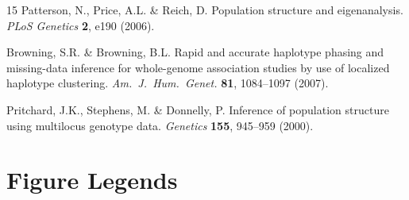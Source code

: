 \documentclass[pdflatex,sn-nature]{sn-jnl}
\begin{document}
\begin{thebibliography}{15}
Patterson, N., Price, A.L. \& Reich, D. Population structure and eigenanalysis. \textit{PLoS Genetics} \textbf{2}, e190 (2006).

Browning, S.R. \& Browning, B.L. Rapid and accurate haplotype phasing and missing-data inference for whole-genome association studies by use of localized haplotype clustering. \textit{Am.\ J.\ Hum.\ Genet.} \textbf{81}, 1084--1097 (2007).

Pritchard, J.K., Stephens, M. \& Donnelly, P. Inference of population structure using multilocus genotype data. \textit{Genetics} \textbf{155}, 945--959 (2000).

\end{thebibliography}


\newpage
\section*{Figure Legends}
\end{document}

